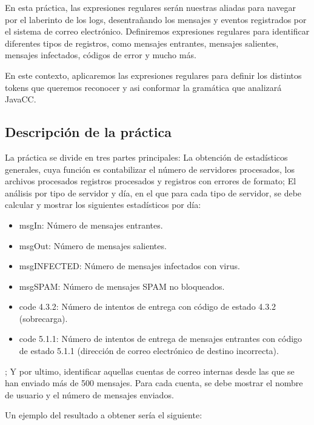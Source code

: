 En esta práctica, las expresiones regulares serán nuestras aliadas para navegar por el laberinto de los logs, desentrañando los mensajes y eventos registrados por el sistema de correo electrónico. Definiremos expresiones regulares para identificar diferentes tipos de registros, como mensajes entrantes, mensajes salientes, mensajes infectados, códigos de error y mucho más.

En este contexto, aplicaremos las expresiones regulares para definir los distintos tokens que queremos reconocer y asi conformar la gramática que analizará JavaCC.

\subsection{Descripción de la práctica}

\noindent La práctica se divide en tres partes principales: La obtención de estadísticos generales, cuya función es contabilizar el número de servidores procesados, los  archivos procesados registros procesados y registros con errores de formato; El análisis por tipo de servidor y día, en el que para cada tipo de servidor, se debe calcular y mostrar los siguientes estadísticos por día:

\begin{itemize}
    \item msgIn: Número de mensajes entrantes.
    \item msgOut: Número de mensajes salientes.
    \item msgINFECTED: Número de mensajes infectados con virus.
    \item msgSPAM: Número de mensajes SPAM no bloqueados.
    \item code 4.3.2: Número de intentos de entrega con código de estado 4.3.2 (sobrecarga).
    \item code 5.1.1: Número de intentos de entrega de mensajes  entrantes con código de estado 5.1.1 (dirección de correo electrónico de destino incorrecta).
\end{itemize}

; Y por ultimo, identificar aquellas cuentas de correo internas desde las que se han enviado más de 500 mensajes. Para cada cuenta, se debe mostrar el nombre de usuario y el número de mensajes enviados.

Un ejemplo del resultado a obtener sería el siguiente:

\lstset{inputencoding=utf8/latin1}


